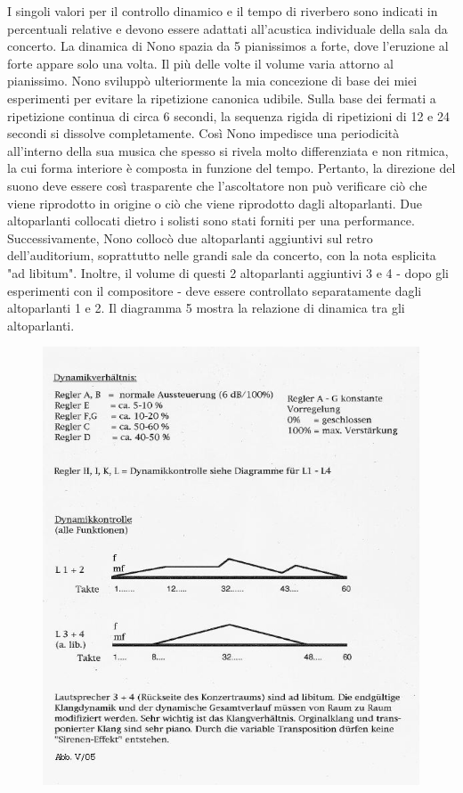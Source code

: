 I singoli valori per il controllo dinamico e il tempo di riverbero sono indicati in percentuali relative e devono essere adattati all'acustica individuale della sala da concerto. La dinamica di Nono spazia da 5 pianissimos a forte, dove l'eruzione al forte appare solo una volta. Il più delle volte il volume varia attorno al pianissimo. Nono sviluppò ulteriormente la mia concezione di base dei miei esperimenti per evitare la ripetizione canonica udibile. Sulla base dei fermati a ripetizione continua di circa 6 secondi, la sequenza rigida di ripetizioni di 12 e 24 secondi si dissolve completamente. Così Nono impedisce una periodicità all'interno della sua musica che spesso si rivela molto differenziata e non ritmica, la cui forma interiore è composta in funzione del tempo. Pertanto, la direzione del suono deve essere così trasparente che l'ascoltatore non può verificare ciò che viene riprodotto in origine o ciò che viene riprodotto dagli altoparlanti. Due altoparlanti collocati dietro i solisti sono stati forniti per una performance. Successivamente, Nono collocò due altoparlanti aggiuntivi sul retro dell'auditorium, soprattutto nelle grandi sale da concerto, con la nota esplicita "ad libitum". Inoltre, il volume di questi 2 altoparlanti aggiuntivi 3 e 4 - dopo gli esperimenti con il compositore - deve essere controllato separatamente dagli altoparlanti 1 e 2. Il diagramma 5 mostra la relazione di dinamica tra gli altoparlanti.

\begin{figure}[htbp]
\begin{center}
\includegraphics[width=1\textwidth]{images/nono/hph/ab_v_05.jpg}
\caption{}
\label{hph-img5}
\end{center}
\end{figure}

